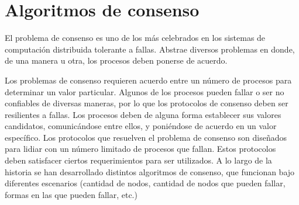 

\section{Algoritmos de consenso}\label{subsubsec:consensus}
El problema de consenso es uno de los más celebrados en los sistemas de computación distribuida tolerante a fallas.
%
Abstrae diversos problemas en donde, de una manera u otra, los procesos deben ponerse de acuerdo.
%

Los problemas de consenso requieren acuerdo entre un número de procesos para determinar un valor particular.
%
Algunos de los procesos pueden fallar o ser no confiables de diversas maneras, por lo que los protocolos de
consenso deben ser resilientes a fallas.
%
Los procesos deben de alguna forma establecer sus valores candidatos, comunicándose entre ellos, y
poniéndose de acuerdo en un valor específico.
%
Los protocolos que resuelven el problema de consenso son diseñados para lidiar con un número limitado de procesos
que fallan.
%
Estos protocolos deben satisfacer ciertos requerimientos para ser utilizados.
%
A lo largo de la historia se han desarrollado distintos algoritmos de consenso, que funcionan bajo diferentes
escenarios (cantidad de nodos, cantidad de nodos que pueden fallar, formas en las que pueden fallar, etc.)

